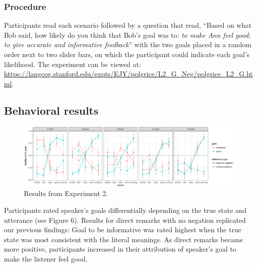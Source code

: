 \documentclass[10pt, letterpaper]{article}
\newenvironment{CodeChunk}{}{}
\begin{document}
\subsubsection{Procedure}\label{procedure-2}

Participants read each scenario followed by a question that read,
``Based on what Bob said, how likely do you think that Bob's goal was
to: \emph{to make Ann feel good}; \emph{to give accurate and informative
feedback}'' with the two goals placed in a random order next to two
slider bars, on which the participant could indicate each goal's
likelihood. The experiment can be viewed at:
\url{https://langcog.stanford.edu/expts/EJY/polgrice/L2_G_Neg/polgrice_L2_G.html}.

\subsection{Behavioral results}\label{behavioral-results-1}

\begin{CodeChunk}
\captionsetup{width=0.8\textwidth}\begin{figure}[b]

{\centering \includegraphics{figs/expt3_results-1} 

}

\caption[Results from Experiment 2]{Results from Experiment 2.}\label{fig:expt3_results}
\end{figure}
\end{CodeChunk}

Participants rated speaker's goals differentially depending on the true
state and utterance (see Figure 6). Results for direct remarks with no
negation replicated our previous findings: Goal to be informative was
rated highest when the true state was most consistent with the literal
meanings. As direct remarks became more positive, participants increased
in their attribution of speaker's goal to make the listener feel good.
\end{document}
